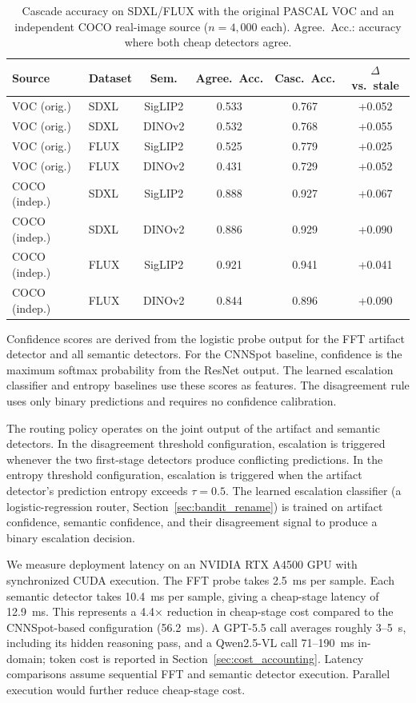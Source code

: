 \documentclass{ieeeaccess}
\begin{document}
\begin{table}[h]
\centering
\footnotesize
\setlength{\tabcolsep}{4pt}
\caption{Cascade accuracy on SDXL/FLUX with the original PASCAL VOC and an independent COCO real-image source ($n{=}4{,}000$ each). Agree.\ Acc.: accuracy where both cheap detectors agree.}
\label{tab:real_image_sources}
\begin{tabular}{llcccc}
\toprule
Source & Dataset & Sem. & Agree.\ Acc. & Casc.\ Acc. & $\Delta$ vs.\ stale \\
\midrule
VOC (orig.) & SDXL & SigLIP2 & 0.533 & 0.767 & +0.052 \\
VOC (orig.) & SDXL & DINOv2  & 0.532 & 0.768 & +0.055 \\
VOC (orig.) & FLUX & SigLIP2 & 0.525 & 0.779 & +0.025 \\
VOC (orig.) & FLUX & DINOv2  & 0.431 & 0.729 & +0.052 \\
\midrule
COCO (indep.) & SDXL & SigLIP2 & 0.888 & 0.927 & +0.067 \\
COCO (indep.) & SDXL & DINOv2  & 0.886 & 0.929 & +0.090 \\
COCO (indep.) & FLUX & SigLIP2 & 0.921 & 0.941 & +0.041 \\
COCO (indep.) & FLUX & DINOv2  & 0.844 & 0.896 & +0.090 \\
\bottomrule
\end{tabular}
\end{table}

Confidence scores are derived from the logistic probe output for the FFT artifact detector and all semantic detectors. For the CNNSpot baseline, confidence is the maximum softmax probability from the ResNet output. The learned escalation classifier and entropy baselines use these scores as features. The disagreement rule uses only binary predictions and requires no confidence
calibration.

The routing policy operates on the joint output of the artifact and semantic detectors.
In the disagreement threshold configuration, escalation is triggered whenever the two first-stage detectors produce conflicting
predictions. In the entropy threshold configuration, escalation is
triggered when the artifact detector's prediction entropy exceeds $\tau = 0.5$. The
learned escalation classifier (a logistic-regression router,
Section~\ref{sec:bandit_rename}) is trained on artifact
confidence, semantic confidence, and their disagreement signal to produce
a binary escalation decision.

We measure deployment latency on an NVIDIA RTX A4500 GPU with synchronized CUDA execution. The FFT probe takes 2.5~ms per sample. Each semantic detector takes 10.4~ms per sample,
giving a cheap-stage latency of 12.9~ms. This represents a 4.4$\times$ reduction in cheap-stage cost compared to the CNNSpot-based configuration (56.2~ms). A GPT-5.5 call averages roughly 3--5~s, including its hidden reasoning pass, and a Qwen2.5-VL call 71--190~ms in-domain; token cost is reported in Section~\ref{sec:cost_accounting}. Latency comparisons assume sequential FFT and semantic detector execution. Parallel
execution would further reduce cheap-stage cost.
\end{document}
